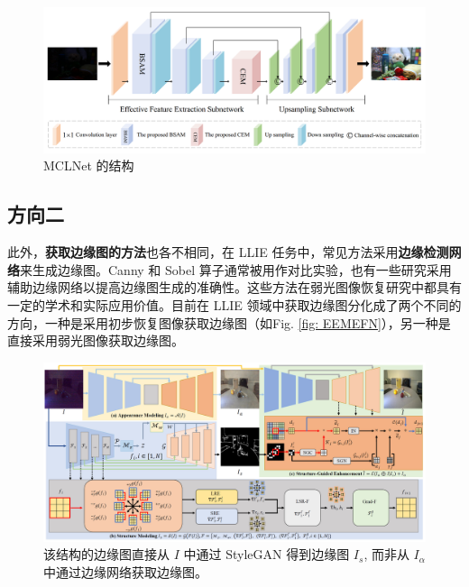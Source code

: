 \documentclass[a4paper]{ctexart}
\begin{document}
	\begin{figure}[htbp]
		\centering 
		\includegraphics[width=\columnwidth]{picture/LLIE/MCLNet/Overview}
		\caption{
			\label{fig: MCLNet} 
			MCLNet 的结构
		}
	\end{figure}
	
	\subsection{方向二}
	
	此外，\textbf{获取边缘图的方法}也各不相同，在 LLIE 任务中，常见方法采用\textbf{边缘检测网络}来生成边缘图。Canny 和 Sobel 算子通常被用作对比实验，也有一些研究采用辅助边缘网络以提高边缘图生成的准确性。这些方法在弱光图像恢复研究中都具有一定的学术和实际应用价值。目前在 LLIE 领域中获取边缘图分化成了两个不同的方向，一种是采用初步恢复图像获取边缘图（如Fig. \ref{fig: EEMEFN}），另一种是直接采用弱光图像获取边缘图。
	
	\begin{figure}[htb]
		\centering 
		\includegraphics[width=\columnwidth]{picture/LLIE/Structure Modeling and Guidance/Overview}
		\caption{
			\label{fig: Overview} 
			该结构的边缘图直接从 $I$ 中通过 StyleGAN 得到边缘图 $I_s$, 而非从 $I_{\alpha}$ 中通过边缘网络获取边缘图。
		}
	\end{figure}
	
\end{document}
